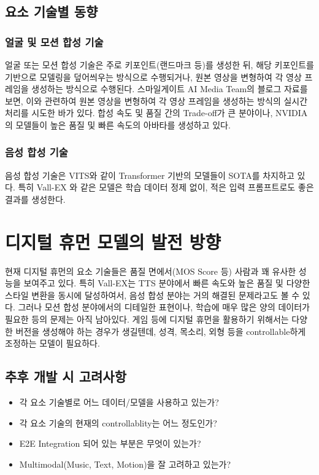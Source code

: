 \documentclass[
	9pt,
	a4paper,
	figtabcapt,
]{oblivoir}
\begin{document}
\subsection{요소 기술별 동향}
\subsubsection{얼굴 및 모션 합성 기술}
얼굴 또는 모션 합성 기술은 주로 키포인트(랜드마크 등)를 생성한 뒤,
해당 키포인트를 기반으로 모델링을 덮어씌우는 방식으로 수행\cite{MeshTalk2021}되거나,
원본 영상을 변형하여 각 영상 프레임을 생성하는 방식\cite{MakeItTalk2020}으로 수행된다.
스마일게이트 AI Media Team의 블로그 자료를 보면,
이와 관련하여 원본 영상을 변형하여 각 영상 프레임을 생성하는 방식의 실시간 처리를 시도한 바가 있다.
합성 속도 및 품질 간의 Trade-off가 큰 분야이나, NVIDIA의 모델들이 높은 품질 및 빠른 속도의 아바타를 생성하고 있다.

\subsubsection{음성 합성 기술}
음성 합성 기술은 VITS\cite{VITS2021}와 같이 Transformer 기반의 모델들이 SOTA를 차지하고 있다.
특히 Vall-EX\cite{vall-eX} 와 같은 모델은 학습 데이터 정제 없이, 적은 입력 프롬프트로도 좋은 결과를 생성한다.

\section{디지털 휴먼 모델의 발전 방향}
현재 디지털 휴먼의 요소 기술들은 품질 면에서(MOS Score 등) 사람과 꽤 유사한 성능을 보여주고 있다.
특히 Vall-EX\cite{vall-eX}는 TTS 분야에서 빠른 속도와 높은 품질 및 다양한 스타일 변환을 동시에 달성하여서,
음성 합성 분야는 거의 해결된 문제라고도 볼 수 있다.
그러나 모션 합성 분야에서의 디테일한 표현이나, 학습에 매우 많은 양의 데이터가 필요한 등의 문제는 아직 남아있다.
게임 등에 디지털 휴먼을 활용하기 위해서는 다양한 버전을 생성해야 하는 경우가 생길텐데,
성격, 목소리, 외형 등을 controllable하게 조정하는 모델이 필요하다.

\subsection{추후 개발 시 고려사항}
\begin{itemize}\tightlist
	\item 각 요소 기술별로 어느 데이터/모델을 사용하고 있는가?
	\item 각 요소 기술의 현재의 controllablity는 어느 정도인가?
	\item E2E Integration 되어 있는 부분은 무엇이 있는가?
	\item Multimodal(Music, Text, Motion)을 잘 고려하고 있는가?
\end{itemize}
 
\clearpage

\clearpage
\end{document}
